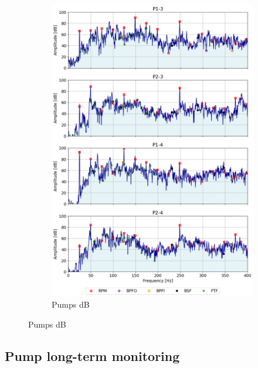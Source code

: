 \begin{figure}[h]
\begin{subfigure}[b]{0.24\textwidth}
        \includegraphics[width=\textwidth]{assets/results/defects/pumps-dB.png}
        \caption{Pumps dB}
    \end{subfigure}
\end{figure}


\subsection{Pump long-term monitoring}

